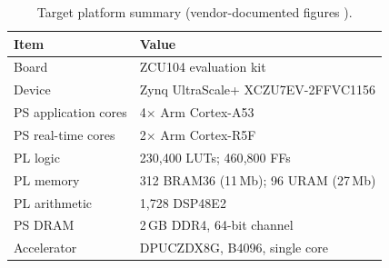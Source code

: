 \documentclass[onecolumn,journal]{IEEEtran}
\begin{document}
\begin{table}[t]
\centering
\caption{Target platform summary (vendor-documented figures \cite{amd_ug1267}).}
\label{tab:platform}
\renewcommand{\arraystretch}{1.2}
\begin{tabular}{ll}
\toprule
Item & Value\\
\midrule
Board & ZCU104 evaluation kit\\
Device & Zynq UltraScale+ XCZU7EV-2FFVC1156\\
PS application cores & 4$\times$ Arm Cortex-A53\\
PS real-time cores & 2$\times$ Arm Cortex-R5F\\
PL logic & 230{,}400 LUTs; 460{,}800 FFs\\
PL memory & 312 BRAM36 (11\,Mb); 96 URAM (27\,Mb)\\
PL arithmetic & 1{,}728 DSP48E2\\
PS DRAM & 2\,GB DDR4, 64-bit channel\\
Accelerator & DPUCZDX8G, B4096, single core\\
\bottomrule
\end{tabular}
\end{table}
\end{document}
